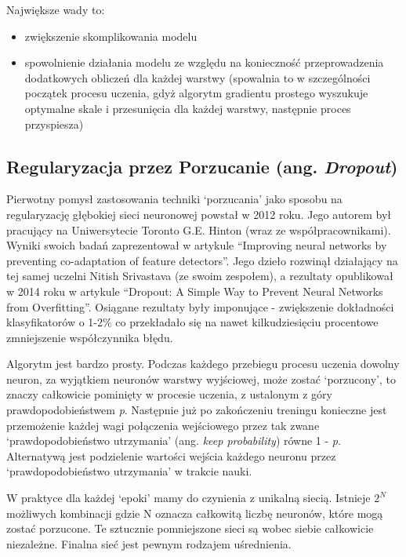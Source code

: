 \documentclass[a4paper,11pt]{article}
\begin{document}
    \bigskip

    Największe wady to\cite{UczenieMaszynowe2018}:
    \begin{itemize}
        \item zwiększenie skomplikowania modelu
        \item spowolnienie działania modelu ze względu na konieczność przeprowadzenia dodatkowych obliczeń dla każdej warstwy (spowalnia to w szczególności początek procesu uczenia, gdyż algorytm gradientu prostego wyszukuje optymalne skale i przesunięcia dla każdej warstwy, następnie proces przyspiesza)
    \end{itemize}

    \subsection{Regularyzacja przez Porzucanie (ang. \textit{Dropout})}

    Pierwotny pomysł zastosowania techniki `porzucania' jako sposobu na regularyzację głębokiej sieci neuronowej powstał w 2012 roku. Jego autorem był pracujący na Uniwersytecie Toronto G.E. Hinton (wraz ze współpracownikami). Wyniki swoich badań zaprezentował w artykule ``Improving neural networks by preventing co-adaptation of feature detectors''\cite{ImprovingNeuralNetworks2012}. Jego dzieło rozwinął działający na tej samej uczelni Nitish Srivastava (ze swoim zespołem), a rezultaty opublikował w 2014 roku w artykule ``Dropout: A Simple Way to Prevent Neural Networks from Overfitting''\cite{Dropout2014}. Osiągane rezultaty były imponujące - zwiększenie dokładności klasyfikatorów o 1-2\% co przekładało się na nawet kilkudziesięciu procentowe zmniejszenie współczynnika błędu.

    \bigskip

    Algorytm jest bardzo prosty. Podczas każdego przebiegu procesu uczenia dowolny neuron, za wyjątkiem neuronów warstwy wyjściowej, może zostać `porzucony', to znaczy całkowicie pominięty w procesie uczenia, z ustalonym z góry prawdopodobieństwem \textit{p}. Następnie już po zakończeniu treningu konieczne jest przemożenie każdej wagi połączenia wejściowego przez tak zwane `prawdopodobieństwo utrzymania' (ang. \textit{keep probability}) równe 1 - \textit{p}. Alternatywą jest podzielenie wartości wejścia każdego neuronu przez `prawdopodobieństwo utrzymania' w trakcie nauki\cite{UczenieMaszynowe2018}.

    \bigskip

    W praktyce dla każdej `epoki' mamy do czynienia z unikalną siecią. Istnieje $2^{N}$ możliwych kombinacji gdzie N oznacza całkowitą liczbę neuronów, które mogą zostać porzucone. Te sztucznie pomniejszone sieci są wobec siebie całkowicie niezależne. Finalna sieć jest pewnym rodzajem uśrednienia\cite{UczenieMaszynowe2018}.
\end{document}
